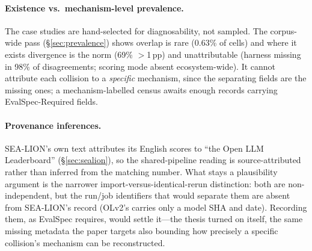 \documentclass[11pt]{article}
\begin{document}
\paragraph{Existence vs.\ mechanism-level prevalence.} The case studies are
hand-selected for diagnosability, not sampled. The corpus-wide pass
(\S\ref{sec:prevalence}) shows overlap is rare (0.63\% of cells) and where it
exists divergence is the norm (69\% $>$1\,pp) and unattributable (harness missing
in 98\% of disagreements; scoring mode absent ecosystem-wide). It cannot attribute
each collision to a \emph{specific} mechanism, since the separating fields are the
missing ones; a mechanism-labelled census awaits enough records carrying
EvalSpec-Required fields.

\paragraph{Provenance inferences.} SEA-LION's own text attributes its English
scores to ``the Open LLM Leaderboard'' (\S\ref{sec:sealion}), so the shared-pipeline
reading is source-attributed rather than inferred from the matching number. What
stays a plausibility argument is the narrower import-versus-identical-rerun
distinction: both are non-independent, but the run/job identifiers that would
separate them are absent from SEA-LION's record (OLv2's carries only a model SHA and
date). Recording them, as EvalSpec requires, would settle it---the thesis turned on
itself, the same missing metadata the paper targets also bounding how precisely a
specific collision's mechanism can be reconstructed.
\end{document}
